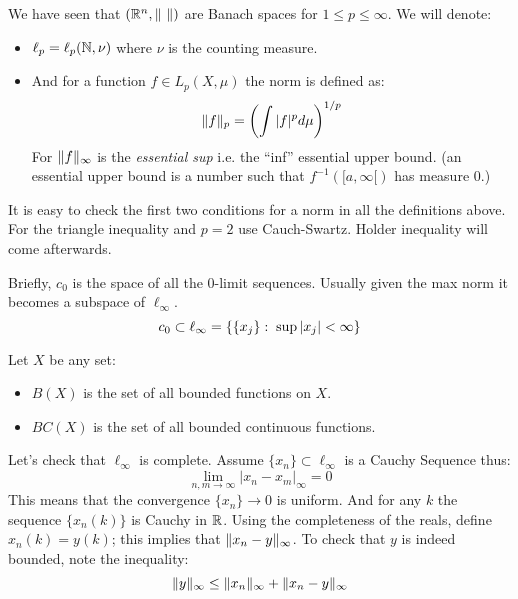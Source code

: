 We have seen that $(\mathbb{R}^n, \Vert\ \Vert)$ are Banach spaces for $1\leq p \leq \infty$. We will denote:
\begin{itemize}
 \item $\ell_p = \ell_p(\mathbb{N},\nu)$ where $\nu$ is the counting measure. 
\item And for a function $f\in L_p(X,\mu)$ the norm is defined as:
$$\Vert f \Vert_p = \left( \int |f|^p d\mu \right)^{1/p}$$ 
For $\Vert f\Vert_\infty$ is the \emph{essential sup} i.e. the ``inf'' essential upper bound. (an essential upper bound is a number such that $f^{-1}([a,\infty[)$ has measure 0.)
\end{itemize}
It is easy to check the first two conditions for a norm in all the definitions above. For the triangle inequality and $p=2$ use Cauch-Swartz. Holder inequality will come afterwards.

\begin{ddef}
Briefly, $c_0$ is the space of all the 0-limit sequences. Usually given the max norm it becomes a subspace of $\ell_\infty$.
$$c_0 \subset \ell_\infty = \{\{x_j\} :\; \sup |x_j| < \infty \}$$
\end{ddef}


\begin{notation}
Let $X$ be any set:
\begin{itemize}
\item $B(X)$ is the set of all bounded functions on $X$.
\item $BC(X)$ is the set of all bounded continuous functions.
\end{itemize}
\end{notation}

\begin{examples}
Let's check that $\ell_\infty$ is complete. Assume $\{x_n \} \subset \ell_\infty$ is a Cauchy Sequence thus:
$$\lim_{n,m\to \infty} |x_n - x_m|_\infty=0$$
This means that the convergence $\{x_n \}\to 0$ is uniform. And for any $k$ the sequence $\{x_n(k) \}$ is Cauchy in $\mathbb{R}$. Using the completeness of the reals, define $x_n(k) = y(k)$; this implies that $\Vert x_n - y \Vert_\infty$. To check that $y$ is indeed bounded, note the inequality: 
$$\Vert y \Vert_\infty \leq \Vert x_n \Vert_\infty + \Vert x_n - y\Vert_\infty$$ 
\end{examples}

